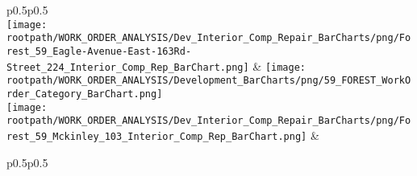                         \begin{center}
                        \tablehead{\hspace{1cm}\\}
                        \tabletail{\hspace{1cm}\\}
                        \begin{supertabular}{p{0.5\textwidth}p{0.5\textwidth}}
                         \\
                        \texttt{[image: \\rootpath/WORK\_ORDER\_ANALYSIS/Dev\_Interior\_Comp\_Repair\_BarCharts/png/Forest\_59\_Eagle-Avenue-East-163Rd-Street\_224\_Interior\_Comp\_Rep\_BarChart.png]} & \texttt{[image: \\rootpath/WORK\_ORDER\_ANALYSIS/Development\_BarCharts/png/59\_FOREST\_WorkOrder\_Category\_BarChart.png]} \\
                                        \texttt{[image: \\rootpath/WORK\_ORDER\_ANALYSIS/Dev\_Interior\_Comp\_Repair\_BarCharts/png/Forest\_59\_Mckinley\_103\_Interior\_Comp\_Rep\_BarChart.png]} &  \hspace{1cm} \\
                                        \end{supertabular}
\end{center}

                        \begin{center}
                        \tablehead{\hspace{1cm}\\}
                        \tabletail{\hspace{1cm}\\}
                        \begin{supertabular}{p{0.5\textwidth}p{0.5\textwidth}}
                         \\
                         \\
                                    \end{supertabular}
                                    \end{center}
                                    